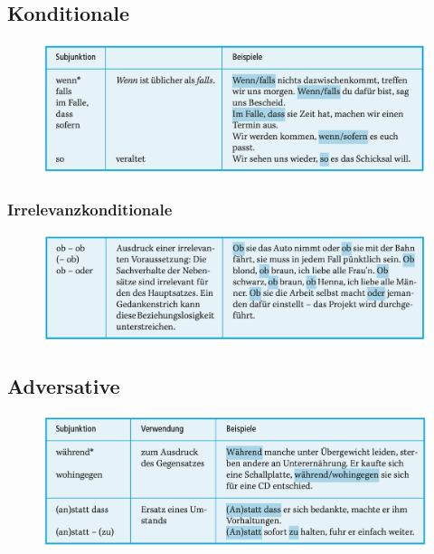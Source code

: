 \documentclass[UTF8]{report}
\begin{document}
\subsection{Konditionale}
\begin{figure}[H]
    \centering
    \includegraphics[scale=0.5]{kon1.png}
\end{figure}

\subsubsection{Irrelevanzkonditionale}
\begin{figure}[H]
    \centering
    \includegraphics[scale=0.5]{kon2.png}
\end{figure}

\subsection{Adversative}
\begin{figure}[H]
    \centering
    \includegraphics[scale=0.55]{ads.png}
\end{figure}
\end{document}
